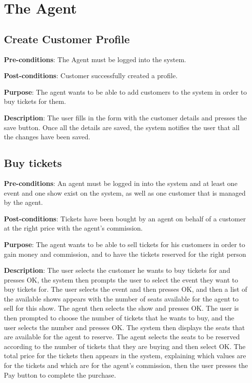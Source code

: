 \section{The Agent}

\subsection{Create Customer Profile}
\textbf{Pre-conditions}: The Agent must be logged into the system.

\textbf{Post-conditions}: Customer successfully created a profile.

\textbf{Purpose}: The agent wants to be able to add customers to the system
in order to buy tickets for them.

\textbf{Description}: The user fills in the form with the customer details
and presses the save button. Once all the details are saved, the system
notifies the user that all the changes have been saved.

\subsection{Buy tickets}
\textbf{Pre-conditions}: An agent must be logged in into the system and
at least one event and one show exist on the system, as well as one customer that is managed by
the agent.

\textbf{Post-conditions}: Tickets have been bought by an agent on behalf of
a customer at the right price with the agent's commission.

\textbf{Purpose}: The agent wants to be able to sell tickets for his customers
in order to gain money and commission, and to have the tickets reserved for the
right person

\textbf{Description}: The user selects the customer he wants to buy tickets for and
presses OK, the system then prompts the user to select the event they want to buy
tickets for. The user selects the event and then presses OK, and then a list of the
available shows appears with the number of seats available for the agent to sell
for this show. The agent then selects the show and presses OK. The user is then
prompted to choose the number of tickets that he wants to buy, and the user selects
the number and presses OK. The system then displays the seats that are available
for the agent to reserve. The agent selects the seats to be reserved according to
the number of tickets that they are buying and then select OK. The total price
for the tickets then appears in the system, explaining which values are for
the tickets and which are for the agent's commission, then the user presses
the Pay button to complete the purchase.

